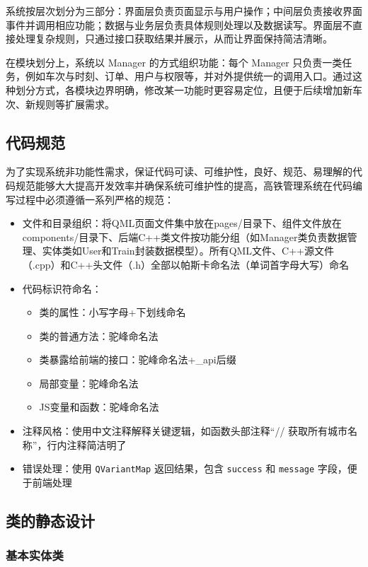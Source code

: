 \documentclass{article}
\begin{document}
			系统按层次划分为三部分：界面层负责页面显示与用户操作；中间层负责接收界面事件并调用相应功能；数据与业务层负责具体规则处理以及数据读写。界面层不直接处理复杂规则，只通过接口获取结果并展示，从而让界面保持简洁清晰。
			
			在模块划分上，系统以 Manager 的方式组织功能：每个 Manager 只负责一类任务，例如车次与时刻、订单、用户与权限等，并对外提供统一的调用入口。通过这种划分方式，各模块边界明确，修改某一功能时更容易定位，且便于后续增加新车次、新规则等扩展需求。
			
		\subsection{代码规范}
			为了实现系统非功能性需求，保证代码可读、可维护性，良好、规范、易理解的代码规范能够大大提高开发效率并确保系统可维护性的提高，高铁管理系统在代码编写过程中必须遵循一系列严格的规范：
			\begin{itemize}
			\item 文件和目录组织：将QML页面文件集中放在pages/目录下、组件文件放在components/目录下、后端C++类文件按功能分组（如Manager类负责数据管理、实体类如User和Train封装数据模型）。所有QML文件、C++源文件（.cpp）和C++头文件（.h）全部以帕斯卡命名法（单词首字母大写）命名
			\item 代码标识符命名：
				\begin{itemize}
				\item 类的属性：小写字母+下划线命名
				\item 类的普通方法：驼峰命名法
				\item 类暴露给前端的接口：驼峰命名法+\_api后缀
				\item 局部变量：驼峰命名法
				\item JS变量和函数：驼峰命名法
				\end{itemize}
			\item 注释风格：使用中文注释解释关键逻辑，如函数头部注释“// 获取所有城市名称”，行内注释简洁明了
			\item 错误处理：使用 \texttt{QVariantMap} 返回结果，包含 \texttt{success} 和 \texttt{message} 字段，便于前端处理
			\end{itemize}
			
		\subsection{类的静态设计}
			\subsubsection{基本实体类}
				
\end{document}
